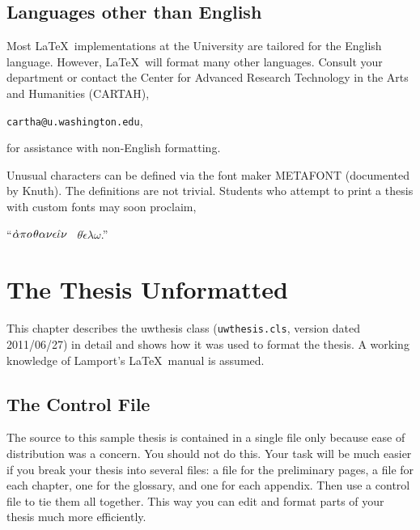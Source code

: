 \documentclass [11pt, twoside] {uwthesis}[2012/06/19]
\let\mffont=\sf
\begin{document}
 
\section{Languages other than English}
 
Most \LaTeX\ implementations at the University are tailored
for the English language.  However, \LaTeX\ will format many
other languages. 
Consult your department or contact the
Center for Advanced Research Technology in the Arts and Humanities (CARTAH),
\smallskip
\begin{center}
{\tt cartha@u.washington.edu},
\end{center}
\smallskip
for assistance with non-English formatting.

Unusual characters can be defined via the
font maker \hbox{\mffont METAFONT} (documented by Knuth\cite{Metafont}).
The definitions are not trivial.
Students who attempt to print a thesis with
custom fonts may soon proclaim,
 
\medskip
\begin{center}
``$\mathaccent"7027\alpha\pi o\kern1pt\theta\alpha\nu\epsilon\hat\iota\nu$
\ $\theta\acute\epsilon\lambda\omega$.''
 
\end{center}
 
 
\chapter{The Thesis Unformatted}
 
This chapter describes the uwthesis class (\texttt{uwthesis.cls},
version dated 2011/06/27)
in detail 
and shows how it was used to format the thesis.
A working knowledge of Lamport's \LaTeX\ manual\cite{Lbook} is assumed.
 
\section{The Control File}
 
The source to this sample thesis is contained in a single file
only because ease of distribution was a concern.
You should not do this.  Your task will be much easier if you
break your thesis into several files:  a file for the preliminary pages,
a file for each chapter,  one for the glossary, and one for each
appendix.  Then use a control file to tie them all together.
This way you can edit and format parts of your thesis much more
efficiently.
 
\end{document}
